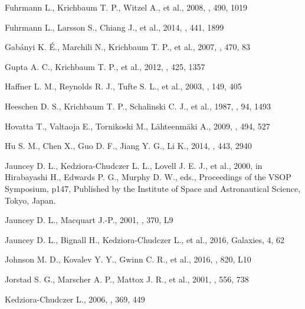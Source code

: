 \documentclass[a4paper,fleqn,usenatbib]{mnras}
\begin{document}
\begin{thebibliography}{99}
Fuhrmann L., Krichbaum T. P., Witzel A., et al., 2008, \aap, 490, 1019

Fuhrmann L., Larsson S., Chiang J., et al., 2014, \mnras, 441, 1899

Gab\'anyi K. \'E., Marchili N., Krichbaum T. P., et al., 2007, \aap, 470, 83

Gupta A. C., Krichbaum T. P., et al., 2012, \mnras, 425, 1357

Haffner L. M., Reynolds R. J., Tufte S. L., et al., 2003, \apjs, 149, 405

Heeschen D. S., Krichbaum T. P., Schalinski C. J., et al., 1987, \aj, 94, 1493

Hovatta T., Valtaoja E., Tornikoski M., L\"ahteenm\"aki A., 2009, \aap, 494, 527

Hu S. M., Chen X., Guo D. F., Jiang Y. G., Li K., 2014, \mnras, 443, 2940

Jauncey D. L., Kedziora-Chudczer L. L., Lovell J. E. J., et al., 2000, in Hirabayashi H., Edwards P. G., Murphy D. W., eds., Proceedings of the VSOP Symposium, p147, Published by the Institute of Space and Astronautical
Science, Tokyo, Japan.

Jauncey D. L., Macquart J.-P., 2001, \aap, 370, L9

Jauncey D. L., Bignall H., Kedziora-Chudczer L., et al., 2016, Galaxies, 4, 62

Johnson M. D., Kovalev Y. Y., Gwinn C. R., et al., 2016, \apj, 820, L10

Jorstad S. G., Marscher A. P., Mattox J. R., et al., 2001, \apj, 556, 738

Kedziora-Chudczer L., 2006, \mnras, 369, 449


\end{thebibliography}
\end{document}

